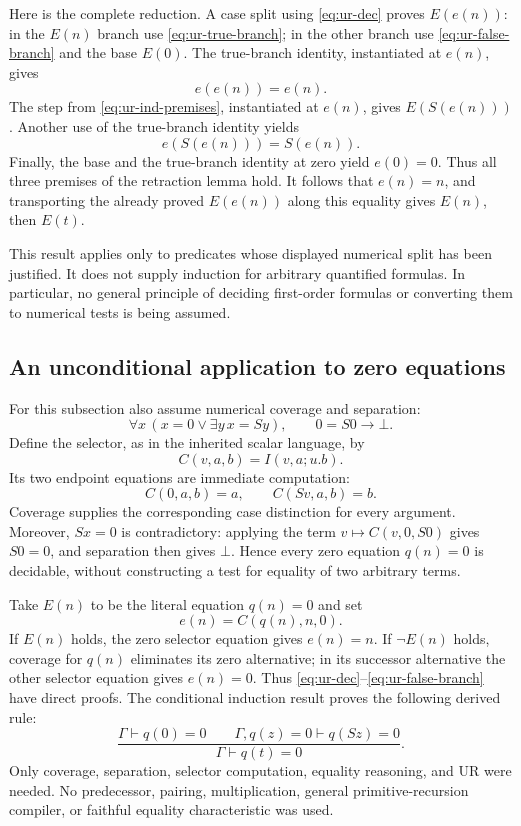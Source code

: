 Here is the complete reduction.  A case split using
\eqref{eq:ur-dec} proves $E(e(n))$: in the $E(n)$ branch use
\eqref{eq:ur-true-branch}; in the other branch use
\eqref{eq:ur-false-branch} and the base $E(0)$.  The true-branch
identity, instantiated at $e(n)$, gives
\[
 e(e(n))=e(n).
\]
The step from \eqref{eq:ur-ind-premises}, instantiated at $e(n)$,
gives $E(S(e(n)))$.  Another use of the true-branch identity yields
\[
 e(S(e(n)))=S(e(n)).
\]
Finally, the base and the true-branch identity at zero yield
$e(0)=0$.  Thus all three premises of the retraction lemma hold.
It follows that $e(n)=n$, and transporting the already proved
$E(e(n))$ along this equality gives $E(n)$, then $E(t)$.

This result applies only to predicates whose displayed numerical
split has been justified.  It does not supply induction for arbitrary
quantified formulas.  In particular, no general principle of deciding
first-order formulas or converting them to numerical tests is being
assumed.

\subsection{An unconditional application to zero equations}

For this subsection also assume numerical coverage and separation:
\[
 \forall x\,(x=0\lor\exists y\,x=Sy),\qquad 0=S0\to\bot.
\]
Define the selector, as in the inherited scalar language, by
\[
 C(v,a,b)=I(v,a;u.b).
\]
Its two endpoint equations are immediate computation:
\[
 C(0,a,b)=a,\qquad C(Sv,a,b)=b.
\]
Coverage supplies the corresponding case distinction for every
argument.  Moreover, $Sx=0$ is contradictory: applying the term
$v\mapsto C(v,0,S0)$ gives $S0=0$, and separation then gives
$\bot$.  Hence every zero equation $q(n)=0$ is decidable, without
constructing a test for equality of two arbitrary terms.

Take $E(n)$ to be the literal equation $q(n)=0$ and set
\[
 e(n)=C(q(n),n,0).
\]
If $E(n)$ holds, the zero selector equation gives $e(n)=n$.
If $\neg E(n)$ holds, coverage for $q(n)$ eliminates its zero
alternative; in its successor alternative the other selector
equation gives $e(n)=0$.  Thus
\eqref{eq:ur-dec}--\eqref{eq:ur-false-branch} have direct proofs.
The conditional induction result proves the following derived rule:
\[
 \frac{\Gamma\vdash q(0)=0\qquad
       \Gamma,q(z)=0\vdash q(Sz)=0}
      {\Gamma\vdash q(t)=0}.
 \tag{ZI}\label{rule:ur-zero-ind}
\]
Only coverage, separation, selector computation, equality reasoning,
and UR were needed.  No predecessor, pairing, multiplication,
general primitive-recursion compiler, or faithful equality
characteristic was used.

